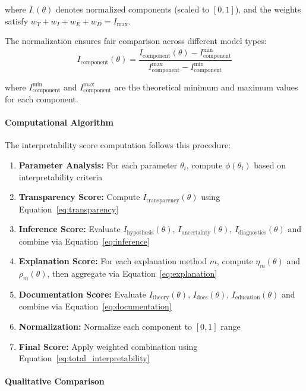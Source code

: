 \documentclass[11pt,a4paper]{article}
\begin{document}
where $\bar{I}_{\cdot}(\theta)$ denotes normalized components (scaled to $[0,1]$), and the weights satisfy $w_T + w_I + w_E + w_D = I_{\max}$.

The normalization ensures fair comparison across different model types:
\begin{equation}
\bar{I}_{\text{component}}(\theta) = \frac{I_{\text{component}}(\theta) - I_{\text{component}}^{\min}}{I_{\text{component}}^{\max} - I_{\text{component}}^{\min}}
\end{equation}

where $I_{\text{component}}^{\min}$ and $I_{\text{component}}^{\max}$ are the theoretical minimum and maximum values for each component.

\paragraph{Computational Algorithm}

The interpretability score computation follows this procedure:

\begin{enumerate}
    \item \textbf{Parameter Analysis:} For each parameter $\theta_i$, compute $\phi(\theta_i)$ based on interpretability criteria
    \item \textbf{Transparency Score:} Compute $I_{\text{transparency}}(\theta)$ using Equation~\ref{eq:transparency}
    \item \textbf{Inference Score:} Evaluate $I_{\text{hypothesis}}(\theta)$, $I_{\text{uncertainty}}(\theta)$, $I_{\text{diagnostics}}(\theta)$ and combine via Equation~\ref{eq:inference}
    \item \textbf{Explanation Score:} For each explanation method $m$, compute $\eta_m(\theta)$ and $\rho_m(\theta)$, then aggregate via Equation~\ref{eq:explanation}
    \item \textbf{Documentation Score:} Evaluate $I_{\text{theory}}(\theta)$, $I_{\text{docs}}(\theta)$, $I_{\text{education}}(\theta)$ and combine via Equation~\ref{eq:documentation}
    \item \textbf{Normalization:} Normalize each component to $[0,1]$ range
    \item \textbf{Final Score:} Apply weighted combination using Equation~\ref{eq:total_interpretability}
\end{enumerate}

\paragraph{Qualitative Comparison}
\end{document}
